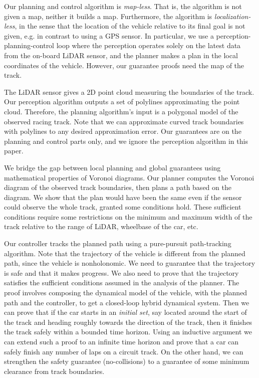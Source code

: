 Our planning and control algorithm is \emph{map-less}.
%
That is, the algorithm is not given a map, neither it builds a map.
%
Furthermore, the algorithm is \emph{localization-less}, in the sense that the location of the vehicle relative to its final goal is not given, e.g. in contrast to using a GPS sensor.
%
In particular, we use a perception-planning-control loop where the perception operates solely on the latest data from the on-board LiDAR sensor, and the planner makes a plan in the local coordinates of the vehicle.
%
However, our guarantee proofs need the map of the track.


The LiDAR sensor gives a 2D point cloud measuring the boundaries of the track.
%
Our perception algorithm outputs a set of polylines approximating the point cloud.
%
Therefore, the planning algorithm's input is a polygonal model of the observed racing track.
%
Note that we can approximate curved track boundaries with polylines to any desired approximation error.
%
Our guarantees are on the planning and control parts only, and we ignore the perception algorithm in this paper.



We bridge the gap between local planning and global guarantees using mathematical properties of Voronoi diagrams.
%
Our planner computes the Voronoi diagram of the observed track boundaries, then plans a path based on the diagram.
%
We show that the plan would have been the same even if the sensor could observe the whole track, granted some conditions hold.
%
These sufficient conditions require some restrictions on the minimum and maximum width of the track relative to the range of LiDAR, wheelbase of the car, etc.


Our controller tracks the planned path using a pure-pursuit path-tracking algorithm.
%
Note that the trajectory of the vehicle is different from the planned path, since the vehicle is nonholonomic.
%
We need to guarantee that the trajectory is safe and that it makes progress.
%
We also need to prove that the trajectory satisfies the sufficient conditions assumed in the analysis of the planner.
%
The proof involves composing the dynamical model of the vehicle, with the planned path and the controller, to get a closed-loop hybrid dynamical system.
%
Then we can prove that if the car starts in an \emph{initial set}, say located around the start of the track and heading roughly towards the direction of the track, then it finishes the track safely within a bounded time horizon.
%
Using an inductive argument we can extend such a proof to an infinite time horizon and prove that a car can safely finish any number of laps on a circuit track.
%
On the other hand, we can strengthen the safety guarantee (no-collisions) to a guarantee of some minimum clearance from track boundaries.

